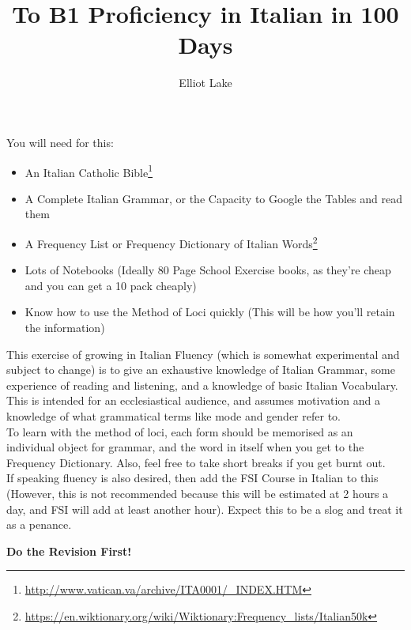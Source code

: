 \documentclass{article}[10pt]
\author{Elliot Lake}
\title{To B1 Proficiency in Italian in 100 Days}
\begin{document}
\maketitle
You will need for this:
\begin{itemize}
	\item An Italian Catholic Bible\footnote{\url{http://www.vatican.va/archive/ITA0001/_INDEX.HTM}}
	\item A Complete Italian Grammar, or the Capacity to Google the Tables and read them
	\item A Frequency List or Frequency Dictionary of Italian Words\footnote{\url{https://en.wiktionary.org/wiki/Wiktionary:Frequency_lists/Italian50k}}
	\item Lots of Notebooks (Ideally 80 Page School Exercise books, as they're cheap and you can get a 10 pack cheaply)
	\item Know how to use the Method of Loci quickly (This will be how you'll retain the information)
\end{itemize}

This exercise of growing in Italian Fluency (which is somewhat experimental and subject to change) is to give an exhaustive knowledge of Italian Grammar, some experience of reading and listening, and a knowledge of basic Italian Vocabulary. This is intended for an ecclesiastical audience, and assumes motivation and a knowledge of what grammatical terms like mode and gender refer to. \\


To learn with the method of loci, each form should be memorised as an individual object for grammar, and the word in itself when you get to the Frequency Dictionary. Also, feel free to take short breaks if you get burnt out.\\

If speaking fluency is also desired, then add the FSI Course in Italian to this (However, this is not recommended because this will be estimated at 2 hours a day, and FSI will add at least another hour). Expect this to be a slog and treat it as a penance. 

\textbf{Do the Revision First!}
\end{document}
